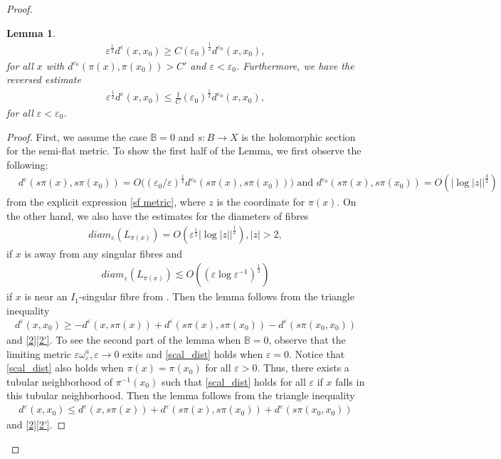 \documentclass[11pt]{amsart}
\theoremstyle{plain}
\newtheorem{lem}[thm]{Lemma}
\theoremstyle{definition}
\numberwithin{equation}{section}
\renewcommand{\leq}{\leqslant}
\renewcommand{\geq}{\geqslant}
\renewcommand{\epsilon}{\varepsilon}
\begin{document}
\begin{proof}
\begin{lem}
	\begin{align}\label{scal_dist2}
		\varepsilon^{\frac{1}{2}}d^{\varepsilon}(x,x_0)\geq {C}{(\epsilon_0)}^{\frac{1}{2}}
		d^{\epsilon_0}(x,x_0),
	\end{align} 
	for all $x$ with $d^{\varepsilon_0}(\pi(x),\pi(x_0))>C'$ and $\varepsilon<\epsilon_0$.
Furthermore, we have the reversed estimate
\begin{align}\label{scal_dist}
	\varepsilon^{\frac{1}{2}} d^{\varepsilon}(x,x_0)\leq  \frac{1}{C}{(\epsilon_0)}^{\frac{1}{2}}
	d^{\epsilon_0}(x,x_0),
\end{align}  for all $\varepsilon<\epsilon_0$.
\end{lem}
\begin{proof}
	First, we assume the case $\mathbb{B}=0$ and $s:B\rightarrow X$ is the holomorphic section for the semi-flat metric. To show the first half of the Lemma, we first observe the following:
  \begin{align}\label{2}
  	 & d^{\epsilon}(s\pi(x),s\pi(x_0))=O\big( (\varepsilon_0/\epsilon)^{\frac{1}{2}} d^{\varepsilon_0}(s\pi(x),s\pi(x_0))  \big ) \mbox{ and } d^{\varepsilon_0}(s\pi(x),s\pi(x_0))=O(|\log{|z|}|^{\frac{3}{2}})
  \end{align}   from the explicit expression \eqref{sf metric}, where $z$ is the coordinate for $\pi(x)$. On the other hand, we also have the estimates for the diameters of fibres 
\begin{align}
	 diam_{\epsilon}(L_{\pi(x)})=O(\epsilon^{\frac{1}{2}}|\log{|z|}|^{\frac{1}{2}}), |z|>2, 
\end{align} if $x$ is away from any singular fibres and 
\begin{align} \label{2'}
	  diam_{\epsilon}(L_{\pi(x)})\lesssim O((\epsilon\log{\epsilon}^{-1})^{\frac{1}{2}})
\end{align} if $x$ is near an $I_1$-singular fibre from \cite[Proposition 3.5]{GW}.
Then the lemma follows from the triangle inequality 
\begin{align*}
	d^{\epsilon}(x,x_0)\geq -d^{\epsilon}(x,s\pi(x))+d^{\epsilon}(s\pi(x),s\pi(x_0))-d^{\epsilon}(s\pi(x_0,x_0))
\end{align*}
 and \eqref{2}\eqref{2'}. 
To see the second part of the lemma when $\mathbb{B}=0$, observe that the limiting metric ${\varepsilon}\omega_{\varepsilon}^a, \varepsilon\rightarrow 0$ exits and \eqref{scal_dist} holds when $\epsilon=0$. Notice that \eqref{scal_dist} also holds when $\pi(x)=\pi(x_0)$ for all $\varepsilon>0$. Thus, there exists a tubular neighborhood of $\pi^{-1}(x_0)$ such that \eqref{scal_dist} holds for all $\varepsilon$ if $x$ falls in this tubular neighborhood. 
Then the lemma follows from the triangle inequality 
\begin{align*}
	d^{\epsilon}(x,x_0)\leq d^{\epsilon}(x,s\pi(x))+d^{\epsilon}(s\pi(x),s\pi(x_0))+d^{\epsilon}(s\pi(x_0,x_0))
\end{align*}
and \eqref{2}\eqref{2'}. 



\end{proof}
\end{proof}
\end{document}
